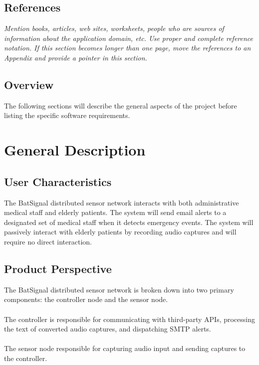 \documentclass[10pt,a4paper]{article}
\begin{document}
\subsection{References}
\textit{Mention books, articles, web sites, worksheets, people who are sources of information about the application domain, etc.
\newline\newline Use proper and complete reference notation. If this section becomes longer than one page, move the references to an Appendix and provide a pointer in this section.}

\subsection{Overview}
\textnormal{The following sections will describe the general aspects of the project before listing the specific software requirements. }

\section{General Description}
\subsection{User Characteristics}
\textnormal{The BatSignal distributed sensor network interacts with both administrative medical staff and elderly patients. The system will send email alerts to a designated set of medical staff when it detects emergency events. The system will passively interact with elderly patients by recording audio captures and will require no direct interaction.}

\subsection{Product Perspective}
\textnormal{The BatSignal distributed sensor network is broken down into two primary components: the controller node and the sensor node. \\\\
The controller is responsible for communicating with third-party APIs, processing the text of converted audio captures, and dispatching SMTP alerts. \\\\
The sensor node responsible for capturing audio input and sending captures to the controller.}
\end{document}
